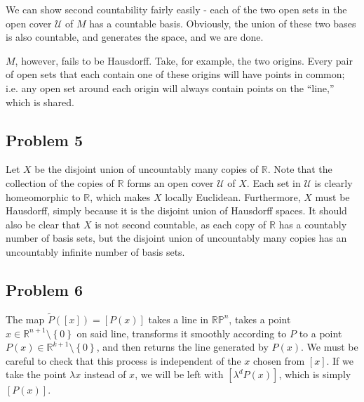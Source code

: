 \documentclass{mathnotes}
\begin{document}
We can show second countability fairly easily - each of the two open sets in the open cover $\mathcal{U}$ of $M$ has a countable basis. Obviously, the union of these two
bases is also countable, and generates the space, and we are done.

$M$, however, fails to be Hausdorff. Take, for example, the two origins. Every pair of open sets that each contain one of these origins will have points in common; i.e.
any open set around each origin will always contain points on the ``line,'' which is shared.

\subsection*{Problem 5}

Let $X$ be the disjoint union of uncountably many copies of $\mathbb{R}$. Note that the collection of the copies of $\mathbb{R}$ forms an open cover $\mathcal{U}$ of $X$.
Each set in $\mathcal{U}$ is clearly homeomorphic to $\mathbb{R}$, which makes $X$ locally Euclidean. Furthermore, $X$ must be Hausdorff, simply because it is the
disjoint union of Hausdorff spaces. It should also be clear that $X$ is not second countable, as each copy of $\mathbb{R}$ has a countably number of basis sets,
but the disjoint union of uncountably many copies has an uncountably infinite number of basis sets.

\subsection*{Problem 6}

The map $\tilde{P}([x])=[P(x)]$ takes a line in $\mathbb{R}\mathbb{P}^n$, takes a point $x\in\mathbb{R}^{n+1}\setminus\left\{ 0 \right\}$ on said line, transforms it smoothly according to $P$
to a point $P(x)\in\mathbb{R}^{k+1}\setminus\left\{ 0 \right\}$, and then returns the line generated by $P(x)$. We must be careful to check that this process is independent of the $x$ chosen
from $[x]$. If we take the point $\lambda x$ instead of $x$, we will be left with $[\lambda^d P(x)]$, which  is simply $[P(x)]$. 

\begin{figure}
    \centering
\end{figure}
\end{document}
